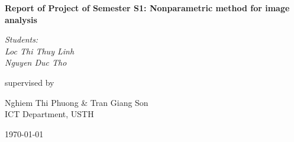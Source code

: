 \begin{titlepage}
\centering
	\vspace{2cm}
	{\huge\bfseries Report of Project of Semester S1: Nonparametric method for image analysis \par}
	\vspace{2cm}
	{\Large\itshape Students:\\
		Loc Thi Thuy Linh\\
		Nguyen Duc Tho\par}
	\vfill
	supervised by\par
	\large Nghiem Thi Phuong \& Tran Giang Son\\
	ICT Department, USTH\par
	\vfill
	{\large \today\par}
\end{titlepage}